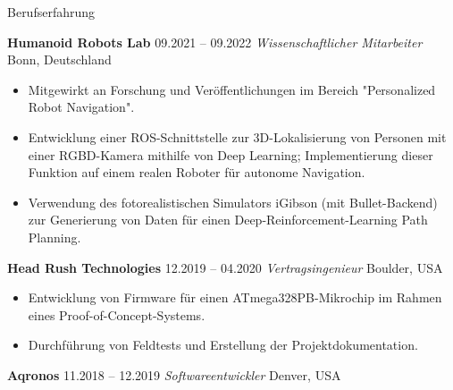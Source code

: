 \begin{rubric}{Berufserfahrung}

%
%
\entry*[] \textbf{Humanoid Robots Lab} \hfill 09.2021 -- 09.2022 \newline  
 \emph{Wissenschaftlicher Mitarbeiter} \hfill Bonn, Deutschland \newline  
\vspace{\CVItemizeHeaderSpacing} \begin{itemize}[leftmargin=*, rightmargin=1cm]
	\setlength{\itemsep}{\CVItemizeSpacing}  
	\item Mitgewirkt an Forschung und Veröffentlichungen im Bereich "Personalized Robot Navigation".  
	\item Entwicklung einer ROS-Schnittstelle zur 3D-Lokalisierung von Personen mit einer RGBD-Kamera mithilfe von Deep Learning; Implementierung dieser Funktion auf einem realen Roboter für autonome Navigation. 
	\item Verwendung des fotorealistischen Simulators iGibson (mit Bullet-Backend) zur Generierung von Daten für einen Deep-Reinforcement-Learning Path Planning.  
\end{itemize}
%
%
\entry*[] \textbf{Head Rush Technologies} \hfill 12.2019 -- 04.2020 \newline  
 \emph{Vertragsingenieur} \hfill Boulder, USA \newline  
\vspace{\CVItemizeHeaderSpacing} \begin{itemize}[leftmargin=*, rightmargin=1cm]
	\setlength{\itemsep}{\CVItemizeSpacing}  
	\item Entwicklung von Firmware für einen ATmega328PB-Mikrochip im Rahmen eines Proof-of-Concept-Systems.
	\item Durchführung von Feldtests und Erstellung der Projektdokumentation.  
\end{itemize}
%
%
\entry*[] \textbf{Aqronos} \hfill 11.2018 -- 12.2019 \newline  
\emph{Softwareentwickler} \hfill Denver, USA \newline  

\end{rubric}
